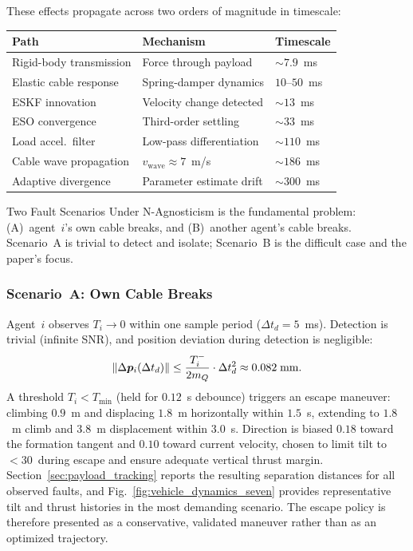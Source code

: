 These effects propagate across two orders of magnitude in timescale:
\begin{center}
\small
\begin{tabular}{@{}lll@{}}
\toprule
Path & Mechanism & Timescale \\
\midrule
Rigid-body transmission & Force through payload & ${\sim}7.9$~ms \\
Elastic cable response & Spring-damper dynamics & $10$--$50$~ms \\
ESKF innovation & Velocity change detected & ${\sim}13$~ms \\
ESO convergence & Third-order settling & ${\sim}33$~ms \\
Load accel.\ filter & Low-pass differentiation & ${\sim}110$~ms \\
Cable wave propagation & $v_{\mathrm{wave}} \approx 7$~m/s & ${\sim}186$~ms \\
Adaptive divergence & Parameter estimate drift & ${\sim}300$~ms \\
\bottomrule
\end{tabular}
\end{center}

Two Fault Scenarios Under N-Agnosticism is the fundamental problem: (A)~agent~$i$'s own cable breaks, and (B)~another agent's cable breaks. Scenario~A is trivial to detect and isolate; Scenario~B is the difficult case and the paper's focus.

\subsubsection{Scenario~A: Own Cable Breaks}

Agent~$i$ observes $T_i \to 0$ within one sample period ($\Delta t_d = 5$~ms). Detection is trivial (infinite SNR), and position deviation during detection is negligible:
\begin{equation}\label{eq:own_cable_deviation}
  \lVert \Delta \bm{p}_i(\Delta t_d) \rVert \leq \frac{T_i^-}{2m_Q} \cdot \Delta t_d^2 \approx 0.082 \;\text{mm}.
\end{equation}
A threshold $T_i < T_{\min}$ (held for $0.12$~s debounce) triggers an escape maneuver: climbing $0.9$~m and displacing $1.8$~m horizontally within $1.5$~s, extending to $1.8$~m climb and $3.8$~m displacement within $3.0$~s. Direction is biased $0.18$ toward the formation tangent and $0.10$ toward current velocity, chosen to limit tilt to ${<}30$\textdegree\ during escape and ensure adequate vertical thrust margin.
Section~\ref{sec:payload_tracking} reports the resulting separation distances for all observed faults, and Fig.~\ref{fig:vehicle_dynamics_seven} provides representative tilt and thrust histories in the most demanding scenario. The escape policy is therefore presented as a conservative, validated maneuver rather than as an optimized trajectory.

